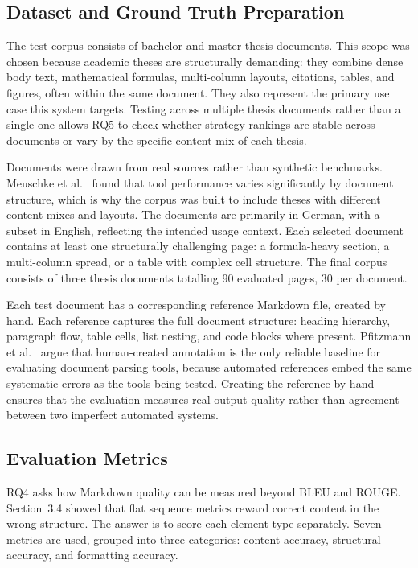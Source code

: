\documentclass[12pt]{article}
\begin{document}
\subsection{Dataset and Ground Truth Preparation}

The test corpus consists of bachelor and master thesis documents. This scope
was chosen because academic theses are structurally demanding: they combine
dense body text, mathematical formulas, multi-column layouts, citations, tables,
and figures, often within the same document. They also represent the primary
use case this system targets. Testing across multiple thesis documents rather
than a single one allows RQ5 to check whether strategy rankings are stable
across documents or vary by the specific content mix of each thesis.

Documents were drawn from real sources rather than synthetic benchmarks.
Meuschke et al.\ \cite{meuschke2023} found that tool performance varies
significantly by document structure, which is why the corpus was built to
include theses with different content mixes and layouts. The documents are
primarily in German, with a subset in English, reflecting the intended usage
context. Each selected document contains at least one structurally challenging
page: a formula-heavy section, a multi-column spread, or a table with complex
cell structure. The final corpus consists of three thesis documents totalling 90 evaluated
pages, 30 per document.

Each test document has a corresponding reference Markdown file, created by
hand. Each reference captures the full document structure: heading hierarchy,
paragraph flow, table cells, list nesting, and code blocks where present.
Pfitzmann et al.\ \cite{pfitzmann2022} argue that human-created annotation is
the only reliable baseline for evaluating document parsing tools, because
automated references embed the same systematic errors as the tools being
tested. Creating the reference by hand ensures that the evaluation measures
real output quality rather than agreement between two imperfect automated
systems.

\subsection{Evaluation Metrics}

RQ4 asks how Markdown quality can be measured beyond BLEU and ROUGE.
Section~3.4 showed that flat sequence metrics reward correct content in
the wrong structure. The answer is to score each element type separately.
Seven metrics are used, grouped into three categories: content accuracy,
structural accuracy, and formatting accuracy.
\end{document}
